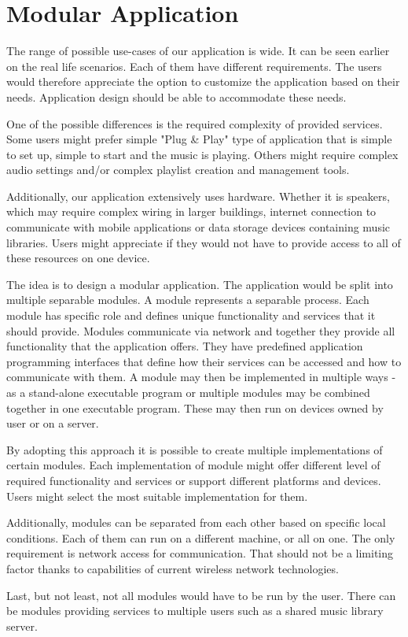 \section{Modular Application}

The range of possible use-cases of our application is wide. It can be seen earlier on the real life scenarios. Each of them have different requirements. The users would therefore appreciate the option to customize the application based on their needs. Application design should be able to accommodate these needs.
\par
One of the possible differences is the required complexity of provided services. Some users might prefer simple "Plug \& Play" type of application that is simple to set up, simple to start and the music is playing. Others might require complex audio settings and/or complex playlist creation and management tools.
\par
Additionally, our application extensively uses hardware. Whether it is speakers, which may require complex wiring in larger buildings, internet connection to communicate with mobile applications or data storage devices containing music libraries. Users might appreciate if they would not have to provide access to all of these resources on one device.
\par
The idea is to design a modular application. The application would be split into multiple separable modules. A module represents a separable process. Each module has specific role and defines unique functionality and services that it should provide. Modules communicate via network and together they provide all functionality that the application offers. They have predefined application programming interfaces that define how their services can be accessed and how to communicate with them. A module may then be implemented in multiple ways - as a stand-alone executable program or multiple modules may be combined together in one executable program. These may then run on devices owned by user or on a server.
\par
By adopting this approach it is possible to create multiple implementations of certain modules. Each implementation of module might offer different level of required functionality and services or support different platforms and devices. Users might select the most suitable implementation for them.
\par 
Additionally, modules can be separated from each other based on specific local conditions. Each of them can run on a different machine, or all on one. The only requirement is network access for communication. That should not be a limiting factor thanks to capabilities of current wireless network technologies.
\par 
Last, but not least, not all modules would have to be run by the user. There can be modules providing services to multiple users such as a shared music library server.

